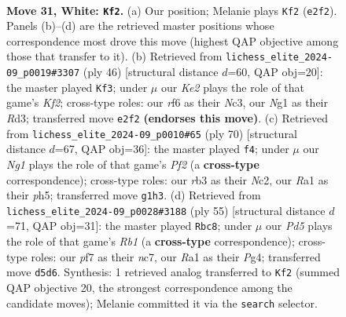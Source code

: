 \documentclass[11pt]{article}
\begin{document}
\clearpage

\begin{figure}[p]\centering
\begin{subfigure}{0.46\textwidth}\centering
\resizebox{\linewidth}{!}{%
\newchessgame
\chessboard[
  setfen={2b3k1/3n1p1p/5rp1/3Pp3/1p2P3/1r3PP1/4K2P/R5NR w - - 4 31},
  showmover=false,
  pgfstyle=straightmove, color=movearrow, markmove={e2-f2}
]}
\caption{}
\end{subfigure}\hfill
\begin{subfigure}{0.46\textwidth}\centering
\resizebox{\linewidth}{!}{%
\newchessgame
\chessboard[
  setfen={r3r1k1/1p3ppp/2pn4/p2p4/P2P1PP1/2NRP3/1P3K2/1R6 w - - 1 24},
  showmover=false,
  pgfstyle=straightmove, color=movearrow, markmove={f2-f3}
]}
\caption{}
\end{subfigure}
\\[4pt]
\begin{subfigure}{0.46\textwidth}\centering
\resizebox{\linewidth}{!}{%
\newchessgame
\chessboard[
  setfen={8/8/2n1pk2/p1Pp3p/rp1P4/4K1P1/PRN2P2/8 w - - 0 36},
  showmover=false,
  pgfstyle=straightmove, color=movearrow, markmove={f2-f4}
]}
\caption{}
\end{subfigure}\hfill
\begin{subfigure}{0.46\textwidth}\centering
\resizebox{\linewidth}{!}{%
\newchessgame
\chessboard[
  setfen={1r1r1n2/ppN5/5pk1/3P3p/5Pp1/4P1P1/PP3K2/2R4R b - - 0 28},
  showmover=false,
  pgfstyle=straightmove, color=movearrow, markmove={b8-c8}
]}
\caption{}
\end{subfigure}
\caption{\textbf{Move 31, White: \texttt{Kf2}.} (a) Our position; Melanie plays \texttt{Kf2} (\texttt{e2f2}). Panels (b)--(d) are the retrieved master positions whose correspondence most drove this move (highest QAP objective among those that transfer to it). (b) Retrieved from \texttt{lichess\_elite\_2024-09\_p0019\#3307} (ply 46) [structural distance $d$=60, QAP obj=20]: the master played \texttt{Kf3}; under $\mu$ our \emph{Ke2} plays the role of that game's \emph{Kf2}; cross-type roles: our \emph{r}f6 as their \emph{N}c3, our \emph{N}g1 as their \emph{R}d3; transferred move \texttt{e2f2} \textbf{(endorses this move)}. (c) Retrieved from \texttt{lichess\_elite\_2024-09\_p0010\#65} (ply 70) [structural distance $d$=67, QAP obj=36]: the master played \texttt{f4}; under $\mu$ our \emph{Ng1} plays the role of that game's \emph{Pf2} (a \textbf{cross-type} correspondence); cross-type roles: our \emph{r}b3 as their \emph{N}c2, our \emph{R}a1 as their \emph{p}h5; transferred move \texttt{g1h3}. (d) Retrieved from \texttt{lichess\_elite\_2024-09\_p0028\#3188} (ply 55) [structural distance $d$=71, QAP obj=31]: the master played \texttt{Rbc8}; under $\mu$ our \emph{Pd5} plays the role of that game's \emph{Rb1} (a \textbf{cross-type} correspondence); cross-type roles: our \emph{p}f7 as their \emph{n}c7, our \emph{R}a1 as their \emph{P}g4; transferred move \texttt{d5d6}. Synthesis: 1 retrieved analog transferred to \texttt{Kf2} (summed QAP objective 20, the strongest correspondence among the candidate moves); Melanie committed it via the \texttt{search} selector.}
\label{fig:thought-m60}
\end{figure}
\end{document}
